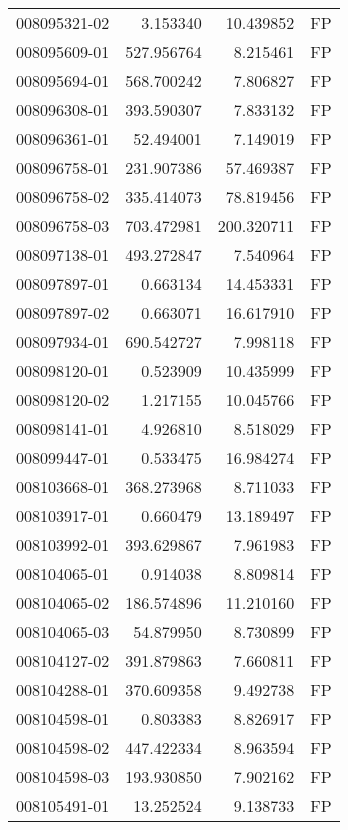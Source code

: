 \begin{tabular}{lrrl}
008095321-02 &    3.153340 &      10.439852 &   FP \\
008095609-01 &  527.956764 &       8.215461 &   FP \\
008095694-01 &  568.700242 &       7.806827 &   FP \\
008096308-01 &  393.590307 &       7.833132 &   FP \\
008096361-01 &   52.494001 &       7.149019 &   FP \\
008096758-01 &  231.907386 &      57.469387 &   FP \\
008096758-02 &  335.414073 &      78.819456 &   FP \\
008096758-03 &  703.472981 &     200.320711 &   FP \\
008097138-01 &  493.272847 &       7.540964 &   FP \\
008097897-01 &    0.663134 &      14.453331 &   FP \\
008097897-02 &    0.663071 &      16.617910 &   FP \\
008097934-01 &  690.542727 &       7.998118 &   FP \\
008098120-01 &    0.523909 &      10.435999 &   FP \\
008098120-02 &    1.217155 &      10.045766 &   FP \\
008098141-01 &    4.926810 &       8.518029 &   FP \\
008099447-01 &    0.533475 &      16.984274 &   FP \\
008103668-01 &  368.273968 &       8.711033 &   FP \\
008103917-01 &    0.660479 &      13.189497 &   FP \\
008103992-01 &  393.629867 &       7.961983 &   FP \\
008104065-01 &    0.914038 &       8.809814 &   FP \\
008104065-02 &  186.574896 &      11.210160 &   FP \\
008104065-03 &   54.879950 &       8.730899 &   FP \\
008104127-02 &  391.879863 &       7.660811 &   FP \\
008104288-01 &  370.609358 &       9.492738 &   FP \\
008104598-01 &    0.803383 &       8.826917 &   FP \\
008104598-02 &  447.422334 &       8.963594 &   FP \\
008104598-03 &  193.930850 &       7.902162 &   FP \\
008105491-01 &   13.252524 &       9.138733 &   FP \\

\end{tabular}
